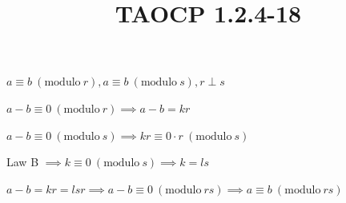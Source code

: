 \documentclass{article}
\title{TAOCP 1.2.4\mbox{-}18}
\begin{document}
\maketitle

\( a \equiv b\ (\mathrm{modulo}\ r), a \equiv b\ (\mathrm{modulo}\ s), r \perp s \)

\( a - b \equiv 0\ (\mathrm{modulo}\ r) \implies a - b = kr \)

\( a - b \equiv 0\ (\mathrm{modulo}\ s) \implies kr \equiv 0\cdot r \ (\mathrm{modulo}\ s) \)

Law B \( \implies k \equiv 0\ (\mathrm{modulo}\ s) \implies k = ls \)

\( a - b = kr = lsr \implies a - b \equiv 0\ (\mathrm{modulo}\ rs) \implies a \equiv b\ (\mathrm{modulo}\ rs) \)
\end{document}
